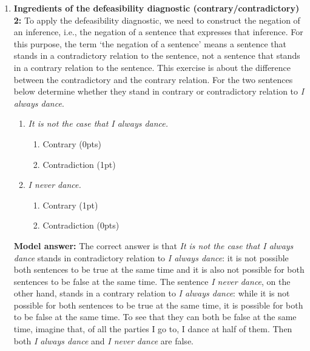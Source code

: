 \documentclass[a4,11pt]{article}
\begin{document}
\begin{enumerate}[leftmargin = 12pt]
 {\bf Model answer:} The correct answer is that {\em It is not the case that everybody danced} and {\em Not everybody danced} stand in contradictory relation to {\em Everybody danced}: it is not possible for these two sentences to be true when {\em Everybody danced} is true and it is also not possible for these two sentences to be false when {\em Everybody danced} is false. The sentence {\em Nobody danced}, on the other hand, stands in a contrary relation to {\em Everybody danced}: while it is not possible for both sentences to be true at the same time, it is possible for both to be false at the same time. To see that they can both be false at the same time, imagine a party at which 3 of the 5 people danced. Then both {\em Nobody danced} and {\em Everybody danced} are both false.
 

\item {\bf Ingredients of the defeasibility diagnostic (contrary/contradictory) 2:} To apply the defeasibility diagnostic, we need to construct the negation of an inference, i.e., the negation of a sentence that expresses that inference. For this purpose, the term `the negation of a sentence' means a sentence that stands in a contradictory relation to the sentence, not a sentence that stands in a contrary relation to the sentence. This exercise is about the difference between the contradictory and the contrary relation. For the two sentences below determine whether they stand in contrary or contradictory relation to \textit{I always dance}.

\begin{enumerate}[noitemsep]
    \item \textit{It is not the case that I always dance.}
        \begin{enumerate}
        \item Contrary (0pts)
        \item Contradiction (1pt)
    \end{enumerate}
     \item \textit{I never dance.}
         \begin{enumerate}
        \item Contrary (1pt)
        \item Contradiction (0pts)
    \end{enumerate}
\end{enumerate}

 {\bf Model answer:} The correct answer is that {\em It is not the case that I always dance} stands in contradictory relation to {\em I always dance}: it is not possible both sentences to be true at the same time and it is also not possible for both sentences to be false at the same time. The sentence {\em I never dance}, on the other hand, stands in a contrary relation to {\em I always dance}: while it is not possible for both sentences to be true at the same time, it is possible for both to be false at the same time. To see that they can both be false at the same time, imagine that, of all the parties I go to, I dance at half of them. Then both {\em I always dance} and {\em I never dance} are false.
  

\end{enumerate}
\end{document}
